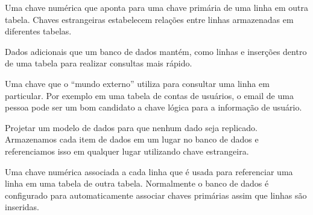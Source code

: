 \begin{descrição}
\item[chave estrangeira:] Uma chave numérica que aponta para uma chave primária
  de uma linha em outra tabela. Chaves estrangeiras estabelecem relações entre
  linhas armazenadas em diferentes tabelas.
  

\item[índice:] Dados adicionais que um banco de dados mantém, como linhas e
  inserções dentro de uma tabela para realizar consultas mais rápido.
  

\item[chave lógica:] Uma chave que o ``mundo externo'' utiliza para consultar
  uma linha em particular. Por exemplo em uma tabela de contas de usuários, o
  email de uma pessoa pode ser um bom candidato a chave lógica para a
  informação de usuário.
  

\item[normatização:] Projetar um modelo de dados para que nenhum dado seja
  replicado. Armazenamos cada item de dados em um lugar no banco de dados
  e referenciamos isso em qualquer lugar utilizando chave estrangeira.
  

\item[chave primária:] Uma chave numérica associada a cada linha que é usada
  para referenciar uma linha em uma tabela de outra tabela. Normalmente o
  banco de dados é configurado para automaticamente associar chaves primárias
  assim que linhas são inseridas.
  

\end{descrição}
